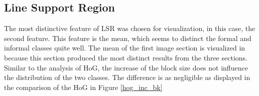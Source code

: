 \subsection{Line Support Region}

The most distinctive feature of LSR was chosen for visualization, in this case,
the second feature. This feature is the mean, which seems to distinct the formal and informal classes quite well. The mean of the first image section is visualized in because this section
produced the most distinct results from the three sections. Similar to the
analysis of HoG, the increase of the block size does not influence the
distribution of the two classes. The difference is as negligible as displayed in
the comparison of the HoG in Figure \ref{hog_inc_bk}


